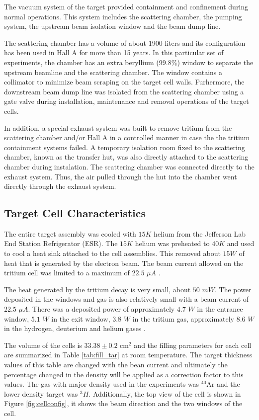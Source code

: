 \documentclass[final,5p,times,twocolumn,balance]{elsarticle}
\begin{document}
The vacuum system of the target provided containment and confinement during normal operations. This system includes the scattering chamber, 
the pumping system, the upstream beam isolation window and the beam dump line.  

The scattering chamber has a volume of about 1900 liters and its configuration has been used in Hall A for more than 15 years. 
In this particular set of experiments, the chamber has an extra beryllium (99.8$\%$) window to separate the upstream beamline 
and the scattering chamber. The window contains a collimator to minimize beam scraping on the target cell walls. Furhermore, 
the downstream beam dump line was isolated from the scattering chamber using a gate valve during installation, maintenance and removal operations of the target cells. 

In addition, a special exhaust system was built to remove tritium from the scattering chamber and/or Hall A in a controlled manner 
in case the the tritium containment systems failed. A temporary isolation room fixed to the scattering chamber, known as 
the transfer hut, was also directly attached to the scattering chamber during instalation. The scattering chamber was connected directly to the exhaust system. Thus, the air pulled through the hut into the chamber went directly through the exhaust system.  


\subsection{Target Cell Characteristics}

The entire target assembly was cooled with $15K$ helium from the Jefferson Lab End Station Refrigerator (ESR). The $15K$ helium was preheated to $40K$ and used to cool a heat sink attached to the cell assemblies. This removed about $15W$ of heat that is generated by the electron beam. 
The beam current allowed on the tritium cell was limited to a maximum of $22.5$ $\mu A$ \cite{engreport}.

The heat generated by the tritium decay is very small, about $50$ $mW$. The power deposited in the windows and gas is also relatively 
small with a beam current of $22.5$ $\mu A$. There was a deposited power of approximately $4.7$ $W$ in the entrance window, $5.1$ $W$ 
in the exit window, $3.8$ $W$ in the tritium gas, approximately $8.6$ $W$ in the hydrogen, deuterium and helium gases \cite{celldes}.
 
The volume of the cells is  $33.38 \pm 0.2$ cm$^{2}$ and the filling parameters for each cell are summarized in Table \ref{tab:fill_tar} at room temperature. The target thickness values of this table are changed with the bean current and ultimately the percentage changed in the density will be applied as a correction factor to this values. The gas with major density used in the experiments was $^{40}$Ar and the lower density target was $^{3}H$.  Additionally, the top view of the cell is shown in Figure \ref{fig:cellconfig},  it shows the beam direction and the two windows of the cell.
\end{document}
